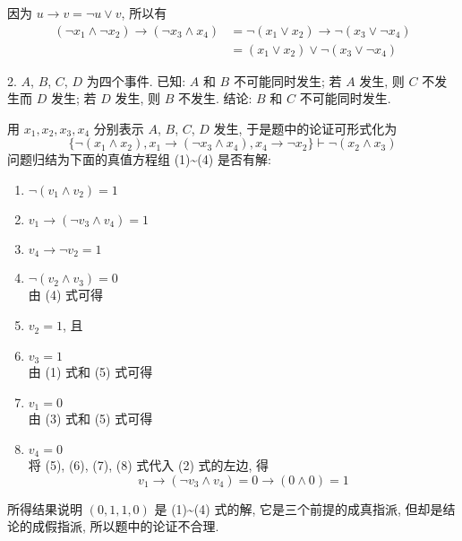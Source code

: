 \documentclass[boxes]{homework}
\begin{document}
\begin{solution}
    因为 $u\to v=\lnot u\lor v$, 所以有
    \begin{equation*}
        \begin{aligned}
            (\lnot x_1\land\lnot x_2)\to(\lnot x_3\land x_4) & = \lnot(x_1\lor x_2)\to \lnot(x_3\lor \lnot x_4) \\
                                                             & = (x_1\lor x_2)\lor \lnot (x_3\lor \lnot x_4)
        \end{aligned}
    \end{equation*}
\end{solution}
\begin{problem}
2. $A$, $B$, $C$, $D$ 为四个事件. 已知: $A$ 和 $B$ 不可能同时发生; 若 $A$ 发生, 则 $C$ 不发生而 $D$ 发生; 若 $D$ 发生, 则 $B$ 不发生. 结论: $B$ 和 $C$ 不可能同时发生.
\end{problem}
\begin{solution}
    用 $x_1, x_2, x_3, x_4$ 分别表示 $A$, $B$, $C$, $D$ 发生, 于是题中的论证可形式化为
    \begin{equation*}
        \{\lnot(x_1\land x_2), x_1\to (\lnot x_3\land x_4), x_4\to \lnot x_2\}\vdash \lnot (x_2\land x_3)
    \end{equation*}
    问题归结为下面的真值方程组 (1)\textasciitilde (4) 是否有解:
    \begin{enumerate}[label = (\arabic*), itemsep = 0em, topsep = .5em, partopsep = .5em]
        \item $\lnot (v_1\land v_2)=1$
        \item $v_1\to (\lnot v_3\land v_4) = 1$
        \item $v_4\to \lnot v_2 = 1$
        \item $\lnot (v_2\land v_3) = 0$\\
              由 (4) 式可得
        \item $v_2 = 1$, 且
        \item $v_3 = 1$\\
              由 (1) 式和 (5) 式可得
        \item $v_1 = 0$\\
              由 (3) 式和 (5) 式可得
        \item $v_4 = 0$\\
              将 (5), (6), (7), (8) 式代入 (2) 式的左边, 得
              $$
                  v_1\to (\lnot v_3\land v_4) = 0\to (0\land 0) = 1
              $$
    \end{enumerate}
    所得结果说明 $(0, 1, 1, 0)$ 是 (1)\textasciitilde (4) 式的解, 它是三个前提的成真指派, 但却是结论的成假指派, 所以题中的论证不合理.
\end{solution}
\end{document}

